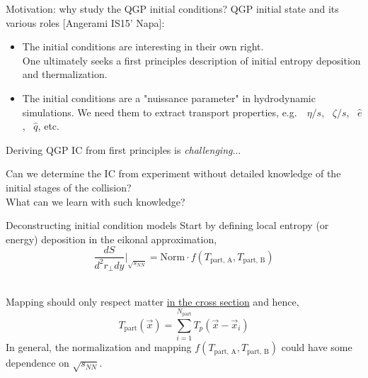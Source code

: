 \documentclass[xcolor=dvipsnames]{beamer}
\begin{document}
\usebackgroundtemplate{}

\begin{frame}{Motivation: why study the QGP initial conditions?}
    \bigskip
    QGP initial state and its various roles {\scriptsize [Angerami IS15' Napa]}: \\
    \begin{itemize}
        \item The initial conditions are interesting in their own right. \\
        \medskip
        One ultimately seeks a first principles description of initial entropy deposition and thermalization. \\
        \medskip
        \item The initial conditions are a "nuissance parameter" in hydrodynamic simulations. We need them to extract transport properties, e.g.\ ~$\eta/s$, ~$\zeta/s$, ~$\hat{e}$, ~$\hat{q}$, etc.     
    \end{itemize}
    \medskip
    Deriving QGP IC from first principles is \emph{challenging}...\\ 
    \medskip
    \begin{tcolorbox}[width=\textwidth, colback=theme!10, colframe=theme!0]
        Can we determine the IC from experiment without detailed knowledge of the initial stages of the collision?
        \medskip \centering \\
        What can we learn with such knowledge?
    \end{tcolorbox}
\end{frame}

\begin{frame}{Deconstructing initial condition models}
    Start by defining local entropy (or energy) deposition in the eikonal approximation,\\ 
    \begin{equation*}
        \frac{dS}{d^2r_\perp dy} \biggr \vert_{\sqrt{s_{NN}}} = \text{Norm} \cdot f(T_\text{part, A}, T_\text{part, B})
    \end{equation*}\\
    \vspace{0.1 cm}
    
    Mapping should only respect matter \underline{in the cross section} and hence,\\
    \begin{equation*}
        T_\text{part}(\vec{x}) = \sum\limits_{i=1}^{N_\text{part}} T_p(\vec{x} - \vec{x}_i)
    \end{equation*}
    In general, the normalization and mapping $f(T_\text{part, A}, T_\text{part, B})$ could have some dependence on $\sqrt{s_{NN}}$.
\end{frame}
\end{document}
